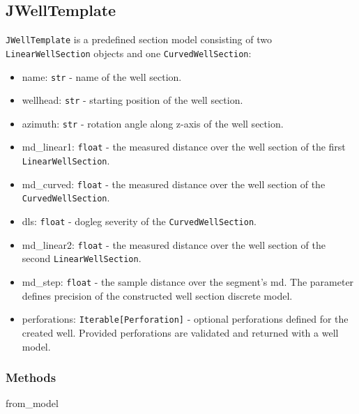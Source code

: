 \subsection{JWellTemplate}
\texttt{JWellTemplate} is a predefined section model consisting of two \texttt{LinearWellSection} objects and one \texttt{CurvedWellSection}:
\begin{itemize}
	\item  \colorbox{gray!20}{name:} \texttt{str} - name of the well section.
	\item  \colorbox{gray!20}{wellhead:} \texttt{str} - starting position of the well section.
	\item  \colorbox{gray!20}{azimuth:} \texttt{str} - rotation angle along z-axis of the well section.
	\item  \colorbox{gray!20}{md\_linear1:} \texttt{float} - the measured distance over the well section of the first \texttt{LinearWellSection}.
	\item  \colorbox{gray!20}{md\_curved:} \texttt{float} - the measured distance over the well section of the \texttt{CurvedWellSection}.
	\item  \colorbox{gray!20}{dls:} \texttt{float} - dogleg severity of the \texttt{CurvedWellSection}.
	\item  \colorbox{gray!20}{md\_linear2:} \texttt{float} - the measured distance over the well section of the second \texttt{LinearWellSection}.
	\item  \colorbox{gray!20}{md\_step:} \texttt{float} - the sample distance over the segment's md. The parameter defines precision of the constructed well section discrete model.
	\item  \colorbox{gray!20}{perforations:} \texttt{Iterable[Perforation]} - optional perforations defined for the created well. Provided perforations are validated and returned with a well model.
\end{itemize}
\subsubsection{Methods}
\begin{description}
	\item[\colorbox{gray!20}{from\_model}] \hfill
\end{description}

